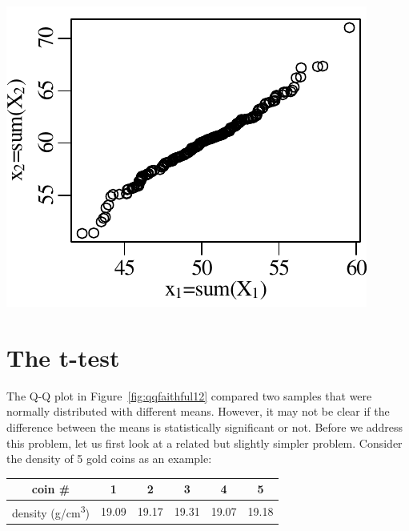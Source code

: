 \noindent\begin{minipage}[t][][b]{.3\textwidth}
  \includegraphics[]{../figures/qqfaithful12.pdf}\medskip
\end{minipage}
\begin{minipage}[t][][t]{.7\textwidth}
  \label{fig:qqfaithful12}
\end{minipage}

\section{The t-test}
\label{sec:t}

The Q-Q plot in Figure~\ref{fig:qqfaithful12} compared two samples
that were normally distributed with different means.  However, it may
not be clear if the difference between the means is statistically
significant or not. Before we address this problem, let us first look
at a related but slightly simpler problem. Consider the density of 5
gold coins as an example:

\begin{center}
\begin{tabular}{c|ccccc}
  coin \# & 1 & 2 & 3 & 4 & 5 \\ \hline
  density (g/cm\textsuperscript{3}) & 19.09 & 19.17 & 19.31 & 19.07 & 19.18
  \label{tab:coins}
\end{tabular}
\end{center}

